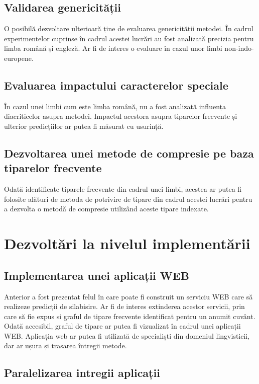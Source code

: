 \subsection{Validarea genericității} 

O posibilă dezvoltare ulterioară ține de evaluarea genericității metodei. În cadrul experimentelor cuprinse în cadrul acestei lucrări au fost analizată precizia pentru limba română și engleză. Ar fi de interes o evaluare în cazul unor limbi non-indo-europene.

\subsection{Evaluarea impactului caracterelor speciale} 

În cazul unei limbi cum este limba română, nu a fost analizată influența diacriticelor asupra metodei. Impactul acestora asupra tiparelor frecvente și ulterior predicțiilor ar putea fi măsurat cu usurință. 

\subsection{Dezvoltarea unei metode de compresie pe baza tiparelor frecvente}

Odată identificate tiparele frecvente din cadrul unei limbi, acestea ar putea fi folosite alături de metoda de potrivire de tipare din cadrul acestei lucrări pentru a dezvolta o metodă de compresie utilizând aceste tipare indexate. 

\section{Dezvoltări la nivelul implementării}

\subsection{Implementarea unei aplicații WEB}

Anterior a fost prezentat felul în care poate fi construit un serviciu WEB care să realizeze predicții de silabisire. Ar fi de interes extinderea acestor servicii, prin care să fie expus si graful de tipare frecvente identificat pentru un anumit cuvânt. Odată accesibil, graful de tipare ar putea fi vizualizat în cadrul unei aplicații WEB. Aplicația web ar putea fi utilizată de specialiști din domeniul lingvisticii, dar ar ușura și trasarea întregii metode.

\subsection{Paralelizarea intregii aplicații}

